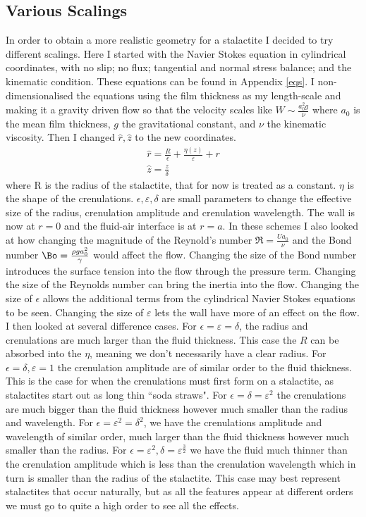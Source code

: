 \documentclass[12pt]{article}
\begin{document}
\subsection{Various Scalings}
In order to obtain a more realistic geometry for a stalactite I decided to try different scalings.
Here I started with the Navier Stokes equation in cylindrical coordinates, with no slip; no flux; tangential and normal stress balance; and the kinematic condition. These equations can be found in Appendix \ref{eqs}. I non-dimensionalised the equations using the film thickness as my length-scale and making it a gravity driven flow so that the velocity scales like $W\sim \frac{a_0^2 g}{\nu}$ where $a_0$ is the mean film thickness, $g$ the gravitational constant, and $\nu$ the kinematic viscosity. Then I changed $\hat{r}, \hat{z}$ to the new coordinates.
\begin{align}
\hat{r} = \frac{R}{\epsilon} + \frac{\eta(z)}{\varepsilon} + r \\
\hat{z} = \frac{z}{\delta}
\end{align}
where R is the radius of the stalactite, that for now is treated as a constant. $\eta$ is the shape of the crenulations. $\epsilon ,\varepsilon, \delta$ are small parameters to change the effective size of the radius, crenulation amplitude and crenulation wavelength. The wall is now at $r=0$ and the fluid-air interface is at $r = a$. In these schemes I also looked at how changing the magnitude of the Reynold's number $\Re = \frac{Ua_0}{\nu}$  and the Bond number $\Bo =\frac{\rho g a_0^2}{\gamma}$ would affect the flow. Changing the size of the Bond number introduces the surface tension into the flow through the pressure term. Changing the size of the Reynolds number can bring the inertia into the flow.
 Changing the size of $\epsilon$ allows the additional terms from the cylindrical Navier Stokes equations to be seen. Changing the size of $\varepsilon$ lets the wall have more of an effect on the flow. I then looked at several difference cases. For $\epsilon = \varepsilon = \delta$, the radius and crenulations are much larger than the fluid thickness. This case the $R$ can be absorbed into the $\eta$, meaning we don't necessarily have a clear radius. For  $\epsilon = \delta, \varepsilon = 1$ the crenulation amplitude are of similar order to the fluid thickness. This is the case for when the crenulations must first form on a stalactite, as stalactites start out as long thin ``soda straws".
 For $\epsilon =\delta = \varepsilon^2 $ the crenulations are much bigger than the fluid thickness however much smaller than the radius and wavelength. For $\epsilon = \varepsilon^2 = \delta^2$, we have the crenulations amplitude and wavelength of similar order, much larger than the fluid thickness however much smaller than the radius. For $\epsilon= \varepsilon^2, \delta = \varepsilon^{\frac{3}{2}}$  we have the fluid much thinner than the crenulation amplitude which is less than the crenulation wavelength which in turn is smaller than the radius of the stalactite. This case may best represent stalactites that occur naturally, but as all the features appear at different orders we must go to quite a high order to see all the effects. 
\end{document}
